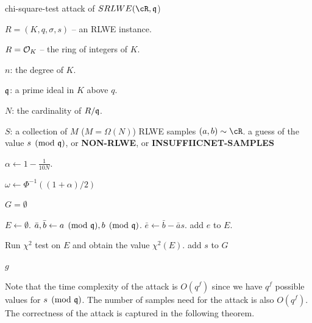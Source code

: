 \documentclass{amsart}
\begin{document}
\begin{algorithm}[H]
\caption{chi-square-test attack of $SRLWE(\cR,\fq$)}          %
\label{IPR}                           %
\begin{algorithmic}[1]              %
     \Require

     $R = (K,q,\sigma, s)$ -- an RLWE instance.

     $R = \mathcal{O}_K$ -- the ring of integers of $K$.

     $n$: the degree of $K$.

     $\mathfrak{q}$: a prime ideal in $K$ above $q$.

     $N$: the cardinality of $R/\mathfrak{q}$.

     $S$: a collection of $M$ ($M = \Omega(N)$) RLWE samples $(a,b) \sim \cR$.
    \Ensure a guess of the value $s \pmod{\mathfrak{q}}$, or {\bf NON-RLWE}, or {\bf INSUFFIICNET-SAMPLES}


    \State $\alpha \gets 1 - \frac{1}{10N}$.

    \State $\omega \gets \Phi^{-1}((1+\alpha)/2)$

    \State $G = \emptyset$

            \State $E \gets \emptyset$.
            \State $\bar{a}, \bar{b} \gets a \pmod{\mathfrak{q}}, b \pmod{\mathfrak{q}}$.
            \State $\bar{e} \gets \bar{b} - \bar{a}s$.
            \State add $e$ to $E$.
        \EndFor

        \State Run $\chi^2$ test on $E$ and obtain the value $\chi^2(E)$.
            \State add $s$ to $G$
        \EndIf
    \EndFor


        \Return $g$
    \Else

    \EndIf

\end{algorithmic}
\end{algorithm}

Note that the time complexity of the attack is $O(q^{f})$ since we have $q^f$ possible values for $s \pmod {\mathfrak{q}}$. The number of samples need for the attack is also $O(q^f)$. The correctness of the attack is captured in the following theorem.
\end{document}

